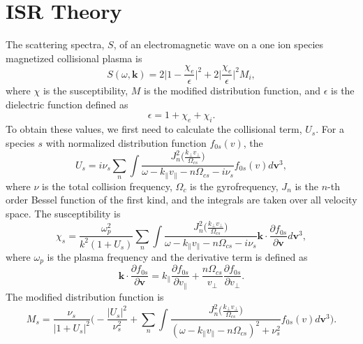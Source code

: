 \section{ISR Theory}
\label{s:ISR-spectra}
The scattering spectra, $S$, of an electromagnetic wave on a one ion species magnetized collisional plasma is
\begin{equation}
	S(\omega,\mathbf{k}) = 2 \Big| 1 - \frac{\chi_e}{\epsilon}\Big|^2
	+ 2\Big|\frac{\chi_e}{\epsilon}\Big|^2 M_i,
	\label{eq:scatterin-spectra}
\end{equation}
where $\chi$ is the susceptibility, 
$M$ is the modified distribution function,
and $\epsilon$ is the dielectric function defined as
\begin{equation}
	\epsilon = 1 + \chi_e + \chi_i.
\end{equation}
To obtain these values, we first need to calculate the collisional term, $U_s$. %
For a species $s$ with normalized distribution function $f_{0s}(v)$, the 
\begin{equation}
	U_s = i \nu_s \sum_n \int 
	\frac{J_n^2\Big( \tfrac{k_\perp v_\perp}{\Omega_{cs}} \Big)}
	{\omega - k_\parallel v_\parallel - n\Omega_{cs} - i\nu_s}  
	f_{0s}(v)   d\mathbf{v}^3 ,
\end{equation}
where $\nu$ is the total collision frequency,
$\Omega_{c}$ is the gyrofrequency,
$J_n$ is the $n$-th order Bessel function of the first kind,
and the integrals are taken over all velocity space.
The susceptibility is
\begin{equation}
	\chi_s = \frac{\omega_p^2}{k^2(1+U_s)} \sum_n \int 
	\frac{J_n^2\Big( \tfrac{k_\perp v_\perp}{\Omega_{cs}} \Big)}
	{\omega - k_\parallel v_\parallel - n\Omega_{cs} - i\nu_s}  
	\mathbf{k} \cdot \frac{\partial f_{0s}}{\partial \mathbf{v}}   d\mathbf{v}^3 ,
\end{equation} 
where $\omega_p$ is the plasma frequency
and the derivative term is defined as
\begin{equation}
	\mathbf{k} \cdot \frac{\partial f_{0s}}{\partial \mathbf{v}} = 
	k_\parallel \frac{\partial f_{0s}}{\partial v_\parallel}
	+ \frac{n \Omega_{cs}}{v_\perp} \frac{\partial f_{0s}}{\partial v_\perp}.
\end{equation}
The modified distribution function is 
\begin{equation}
	M_s = \frac{\nu_s}{|1+U_s|^2}
	\Bigg( - \frac{|U_s|^2}{\nu_s^2} 
	+ \sum_n \int 
	\frac{J_n^2\Big( \tfrac{k_\perp v_\perp}{\Omega_{cs}} \Big)}
	{(\omega - k_\parallel v_\parallel - n\Omega_{cs})^2 + \nu_s^2}
	f_{0s}(v)   d\mathbf{v}^3 \Bigg).
\end{equation}

